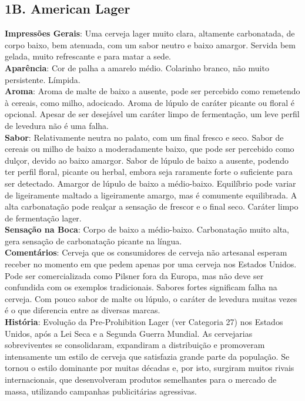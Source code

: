 \subsection*{1B. American Lager}
\textbf{Impressões Gerais}: Uma cerveja lager muito clara, altamente carbonatada, de corpo baixo, bem atenuada, com um sabor neutro e baixo amargor. Servida bem gelada, muito refrescante e para matar a sede. \\
\textbf{Aparência}: Cor de palha a amarelo médio. Colarinho branco, não muito persistente. Límpida. \\
\textbf{Aroma}: Aroma de malte de baixo a ausente, pode ser percebido como remetendo à cereais, como milho, adocicado. Aroma de lúpulo de caráter picante ou floral é opcional. Apesar de ser desejável um caráter limpo de fermentação, um leve perfil de levedura não é uma falha. \\
\textbf{Sabor}: Relativamente neutra no palato, com um final fresco e seco. Sabor de cereais ou milho de baixo a moderadamente baixo, que pode ser percebido como dulçor, devido ao baixo amargor. Sabor de lúpulo de baixo a ausente, podendo ter perfil floral, picante ou herbal, embora seja raramente forte o suficiente para ser detectado. Amargor de lúpulo de baixo a médio-baixo. Equilíbrio pode variar de ligeiramente maltado a ligeiramente amargo, mas é comumente equilibrada. A alta carbonatação pode realçar a sensação de frescor e o final seco. Caráter limpo de fermentação lager. \\
\textbf{Sensação na Boca}: Corpo de baixo a médio-baixo. Carbonatação muito alta, gera sensação de carbonatação picante na língua. \\
\textbf{Comentários}: Cerveja que os consumidores de cerveja não artesanal esperam receber no momento em que pedem apenas por uma cerveja nos Estados Unidos. Pode ser comercializada como Pilsner fora da Europa, mas não deve ser confundida com os exemplos tradicionais. Sabores fortes significam falha na cerveja. Com pouco sabor de malte ou lúpulo, o caráter de levedura muitas vezes é o que diferencia entre as diversas marcas. \\
\textbf{História}: Evolução da Pre-Prohibition Lager (ver Categoria 27) nos Estados Unidos, após a Lei Seca e a Segunda Guerra Mundial. As cervejarias sobreviventes se consolidaram, expandiram a distribuição e promoveram intensamente um estilo de cerveja que satisfazia grande parte da população. Se tornou o estilo dominante por muitas décadas e, por isto, surgiram muitos rivais internacionais, que desenvolveram produtos semelhantes para o mercado de massa, utilizando campanhas publicitárias agressivas. \\
